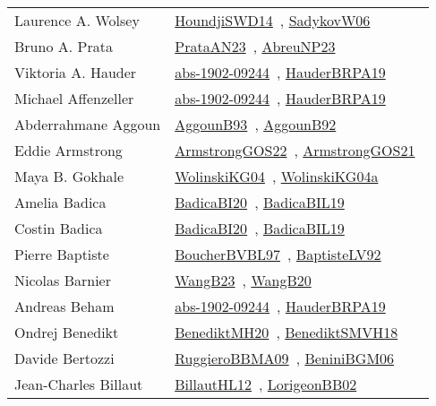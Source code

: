 {\begin{longtable}{p{4cm}p{20cm}}
Laurence A. Wolsey & \href{works/HoundjiSWD14.pdf}{HoundjiSWD14}~\cite{HoundjiSWD14}, \href{}{SadykovW06}~\cite{SadykovW06}\\
Bruno A. Prata & \href{works/PrataAN23.pdf}{PrataAN23}~\cite{PrataAN23}, \href{}{AbreuNP23}~\cite{AbreuNP23}\\
Viktoria A. Hauder & \href{works/abs-1902-09244.pdf}{abs-1902-09244}~\cite{abs-1902-09244}, \href{works/HauderBRPA19.pdf}{HauderBRPA19}~\cite{HauderBRPA19}\\
Michael Affenzeller & \href{works/abs-1902-09244.pdf}{abs-1902-09244}~\cite{abs-1902-09244}, \href{works/HauderBRPA19.pdf}{HauderBRPA19}~\cite{HauderBRPA19}\\
Abderrahmane Aggoun & \href{works/AggounB93.pdf}{AggounB93}~\cite{AggounB93}, \href{}{AggounB92}~\cite{AggounB92}\\
Eddie Armstrong & \href{works/ArmstrongGOS22.pdf}{ArmstrongGOS22}~\cite{ArmstrongGOS22}, \href{works/ArmstrongGOS21.pdf}{ArmstrongGOS21}~\cite{ArmstrongGOS21}\\
Maya B. Gokhale & \href{works/WolinskiKG04.pdf}{WolinskiKG04}~\cite{WolinskiKG04}, \href{}{WolinskiKG04a}~\cite{WolinskiKG04a}\\
Amelia Badica & \href{}{BadicaBI20}~\cite{BadicaBI20}, \href{works/BadicaBIL19.pdf}{BadicaBIL19}~\cite{BadicaBIL19}\\
Costin Badica & \href{}{BadicaBI20}~\cite{BadicaBI20}, \href{works/BadicaBIL19.pdf}{BadicaBIL19}~\cite{BadicaBIL19}\\
Pierre Baptiste & \href{}{BoucherBVBL97}~\cite{BoucherBVBL97}, \href{works/BaptisteLV92.pdf}{BaptisteLV92}~\cite{BaptisteLV92}\\
Nicolas Barnier & \href{works/WangB23.pdf}{WangB23}~\cite{WangB23}, \href{works/WangB20.pdf}{WangB20}~\cite{WangB20}\\
Andreas Beham & \href{works/abs-1902-09244.pdf}{abs-1902-09244}~\cite{abs-1902-09244}, \href{works/HauderBRPA19.pdf}{HauderBRPA19}~\cite{HauderBRPA19}\\
Ondrej Benedikt & \href{works/BenediktMH20.pdf}{BenediktMH20}~\cite{BenediktMH20}, \href{works/BenediktSMVH18.pdf}{BenediktSMVH18}~\cite{BenediktSMVH18}\\
Davide Bertozzi & \href{works/RuggieroBBMA09.pdf}{RuggieroBBMA09}~\cite{RuggieroBBMA09}, \href{works/BeniniBGM06.pdf}{BeniniBGM06}~\cite{BeniniBGM06}\\
Jean{-}Charles Billaut & \href{works/BillautHL12.pdf}{BillautHL12}~\cite{BillautHL12}, \href{}{LorigeonBB02}~\cite{LorigeonBB02}\\

\end{longtable}}
